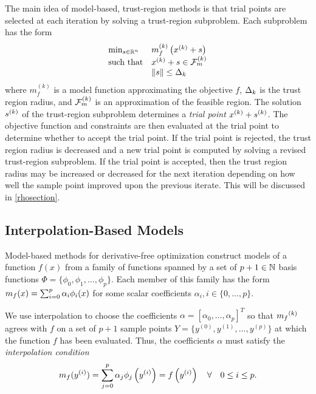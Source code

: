 \documentclass{article}
\begin{document}
The main idea of model-based, trust-region methods is that trial points are selected at each iteration by solving a trust-region subproblem.  
Each subproblem has the form 
\[ \begin{array}{ll} \min_{s \in \mathbb R^n} & m_f^{(k)}\left(x^{(k)} + s\right) \\ 
\textrm{such that} & x^{(k)}+s \in {\mathcal F_m^{(k)}} \\
& {\left\|s\right\|} \le \Delta_k
\end{array} \]
where $m_f^{(k)}$ is a model function approximating the objective $f$, $\Delta_k$ is the trust region radius,
and ${\mathcal F_m^{(k)}}$ is an approximation of the feasible region.
The solution ${{s}^{(k)}}$ of the trust-region subproblem determines a {\em trial point} $x^{(k)} + {{s}^{(k)}}$.  
The objective function and constraints are then evaluated at the trial point to determine whether to accept the trial point.
If the trial point is rejected, the trust region radius is decreased and a new trial point is computed by solving a revised trust-region subproblem.     
If the trial point is accepted, then the trust region radius may be increased or decreased for the next iteration 
depending on how well the sample point improved upon the previous iterate.
This will be discussed in \cref{rhosection}.





\subsection{Interpolation-Based Models}

\label{interpolation}

Model-based methods for derivative-free optimization construct models of a function $f(x)$ from a family of functions spanned by a set of $p + 1 \in \mathbb N$ basis functions  $\Phi = \{\phi_0, \phi_1, \ldots, \phi_p\}$. Each member of this family has the form ${{m}_f}(x) = \sum_{i=0}^p\alpha_i\phi_i(x)$ for some scalar coefficients $\alpha_i, i \in \{0, \ldots, p\}$.

We use interpolation to choose the coefficients $\alpha = [\alpha_0, \ldots, \alpha_p]^T$ so that ${{m}_f}^{(k)}$ agrees with $f$ on a set of $p+1$ sample points $Y = \{y^{(0)}, y^{(1)}, \ldots, y^{(p)}\}$ at which the function $f$ has been evaluated.
Thus, the coefficients $\alpha$ must satisfy the \emph{interpolation condition}
\begin{align}
\label{interpolation_condition}
{{m}_f}(y^{(i)}) = \sum^p_{j=0}\alpha_j\phi_j\left(y^{(i)}\right) = f\left(y^{(i)}\right) \quad \forall \quad 0 \le i \le p.
\end{align}
\end{document}
